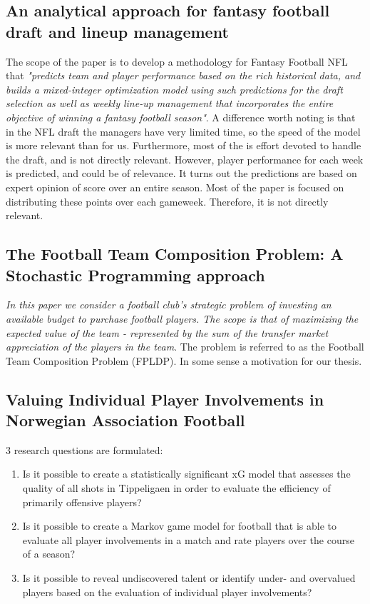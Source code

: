 \subsection{An analytical approach for fantasy football draft
and lineup management}
The scope of the paper is to develop a methodology for Fantasy Football NFL that \textit{"predicts team and player performance based on the rich historical data, and builds a mixed-integer optimization model using such predictions for the draft selection as well as weekly line-up management that incorporates the entire objective of winning a fantasy football season"}. A difference worth noting is that in the NFL draft the managers have very limited time, so the speed of the model is more relevant than for us. Furthermore, most of the is effort devoted to handle the draft, and is not directly relevant. However, player performance for each week is predicted, and could be of relevance. It turns out the predictions are based on expert opinion of score over an entire season. Most of the paper is focused on distributing these points over each gameweek. Therefore, it is not directly relevant. 
\newpar

\subsection{The Football Team Composition Problem: A Stochastic Programming approach}
\textit{In this paper we consider a football club’s strategic problem of investing an available budget to purchase football players. The scope is that of maximizing the expected value of the team - represented by the sum of the transfer market appreciation of the players in the team}. The problem is referred to as the Football Team Composition Problem (FPLDP). In some sense a motivation for our thesis.

\subsection{Valuing Individual Player Involvements in
Norwegian Association Football}

3 research questions are formulated:
\begin{enumerate}
    \item Is it possible to create a statistically significant xG model that assesses the quality of all shots in Tippeligaen in order to evaluate the efficiency of primarily offensive players?
    \item Is it possible to create a Markov game model for football that is able to evaluate all player involvements in a match and rate players over the course of a season?
    \item Is it possible to reveal undiscovered talent or identify under- and overvalued players based on the evaluation of individual player involvements?
\end{enumerate} 


